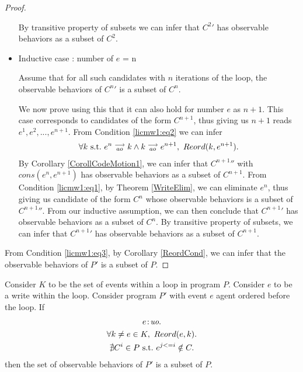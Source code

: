 \begin{proof}
\begin{itemize}
        By transitive property of subsets we can infer that $C^2'$ has observable behaviors as a subset of $C^2$.
        
        \item Inductive case : number of $e$ = n

        Assume that for all such candidates with $n$ iterations of the loop, the observable behaviors of $C^n'$ is a subset of $C^n$.

        We now prove using this that it can also hold for number $e$ as $n + 1$. 
        This case corresponds to candidates of the form $C^{n+1}$, thus giving us $n+1$ reads $e^1, e^2,...,e^{n+1}$.
        From Condition \ref{licmw1:eq2} we can infer 
        \begin{align*}
            \forall k \ \text{s.t.} \ e^n\stackrel{\longrightarrow}{_{ao}}k \wedge k\stackrel{\longrightarrow}{_{ao}}e^{n+1}, \ Reord(k,e^{n+1}).
        \end{align*}
        By Corollary \ref{CorollCodeMotion1}, we can infer that $C^{n+1}''$ with $cons(e^n, e^{n+1})$ has observable behaviors as a subset of $C^{n+1}$. 
        From Condition \ref{licmw1:eq1}, by Theorem \ref{WriteElim}, we can eliminate $e^{n}$, thus giving us candidate of the form $C^n$ whose observable behaviors is a subset of $C^{n+1}''$.
        From our inductive assumption, we can then conclude that $C^{n+1}'$ has observable behaviors as a subset of $C^n$. 
        By transitive property of subsets, we can infer that $C^{n+1}'$ has observable behaviors as a subset of $C^{n+1}$.

    \end{itemize}

    From Condition \ref{licmw1:eq3}, by Corollary \ref{ReordCond}, we can infer that the observable behaviors of $P'$ is a subset of $P$.

\end{proof}


\begin{corollary}
    \label{LoopInvCodeMotWrite2}
    Consider $K$ to be the set of events within a loop in program $P$. 
    Consider $e$ to be a write within the loop. 
    Consider program $P'$ with event $e$ agent ordered before the loop. 
    If
    \begin{gather*}
        e\!:\!\textit{uo}. \label{licmw2:eq1}\\
        \forall k \neq e \in K, \ Reord(e, k). \label{licmw2:eq2}\\ 
        \nexists C^i \in P \ \text{s.t.} \ e^{j<=i} \notin C.  \label{licmw2:eq3}                    
    \end{gather*}
    then the set of observable behaviors of $P'$ is a subset of $P$.

\end{corollary}             

